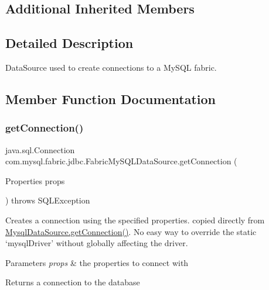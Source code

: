 \subsection*{Additional Inherited Members}


\subsection{Detailed Description}
Data\+Source used to create connections to a My\+S\+QL fabric. 

\subsection{Member Function Documentation}
\mbox{\label{classcom_1_1mysql_1_1fabric_1_1jdbc_1_1_fabric_my_s_q_l_data_source_aaade1a90a7a191696ad1d05c3f79cc45}} 
\subsubsection{\texorpdfstring{get\+Connection()}{getConnection()}}
{\footnotesize\ttfamily java.\+sql.\+Connection com.\+mysql.\+fabric.\+jdbc.\+Fabric\+My\+S\+Q\+L\+Data\+Source.\+get\+Connection (\begin{DoxyParamCaption}\item[{Properties}]{props }\end{DoxyParamCaption}) throws S\+Q\+L\+Exception\hspace{0.3cm}{\ttfamily [protected]}}

Creates a connection using the specified properties. copied directly from \mbox{\hyperlink{classcom_1_1mysql_1_1jdbc_1_1jdbc2_1_1optional_1_1_mysql_data_source_aa19c209327ac343921cb8b4f2e2b30ab}{Mysql\+Data\+Source.\+get\+Connection()}}. No easy way to override the static `mysql\+Driver' without globally affecting the driver.


\begin{DoxyParams}{Parameters}
{\em props} & the properties to connect with\\
\hline
\end{DoxyParams}
\begin{DoxyReturn}{Returns}
a connection to the database
\end{DoxyReturn}

